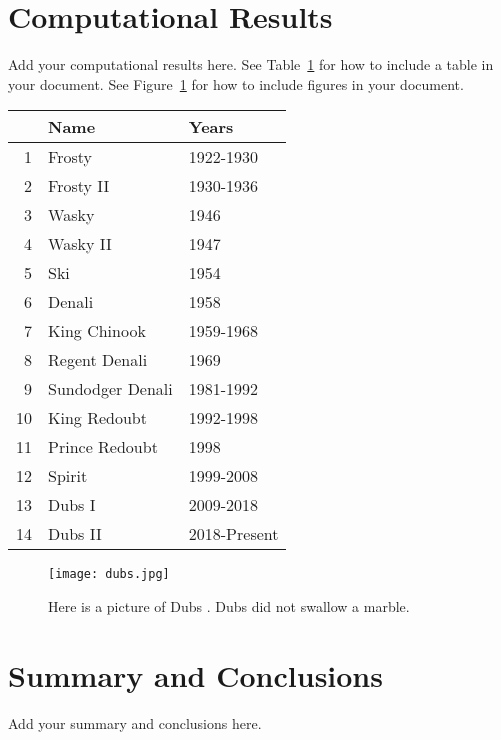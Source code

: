 \documentclass{article}
\begin{document}
\section{Computational Results}
Add your computational results here. See Table~\ref{tab:mascots} for how to include a table in your document. See Figure~\ref{fig:dubs} for how to include figures in your document.

\begin{table}
    \centering
    \begin{tabular}{rll}
    & Name & Years \\
    \hline
    1 & Frosty & 1922-1930  \\
    2 & Frosty II & 1930-1936 \\
    3 & Wasky & 1946 \\
    4 & Wasky II & 1947 \\
    5 & Ski & 1954 \\
    6 & Denali & 1958 \\
    7 & King Chinook & 1959-1968\\
    8 & Regent Denali & 1969 \\
    9 & Sundodger Denali & 1981-1992 \\
    10 & King Redoubt & 1992-1998 \\
    11 & Prince Redoubt & 1998 \\
    12 & Spirit & 1999-2008 \\
    13 & Dubs I & 2009-2018 \\
    14 & Dubs II & 2018-Present
    \end{tabular}

    \label{tab:mascots}
\end{table}

\begin{figure}
    \centering
    \texttt{[image: dubs.jpg]}
    \caption{Here is a picture of Dubs \cite{webeck_2018}. Dubs did not swallow a marble.}
    \label{fig:dubs}
\end{figure}

\section{Summary and Conclusions}
Add your summary and conclusions here.

\printbibliography
\end{document}
